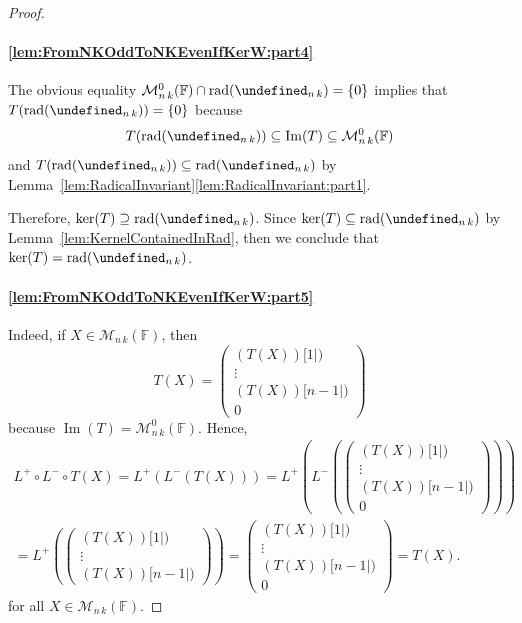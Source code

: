 \documentclass{elsarticle}
\DeclareMathOperator{\rad}{rad}
\DeclareMathOperator{\Ker}{ker}
\DeclareMathOperator{\Img}{Im}
\def\F{{\mathbb F}}
\def\M{{\mathcal M}}
\let\det\undefined
\DeclareMathOperator{\det}{det}
\theoremstyle{plain}
\theoremstyle{definition}
\numberwithin{equation}{section}
\begin{document}
\begin{proof}~\paragraph{\ref{lem:FromNKOddToNKEvenIfKerW:part4}} The obvious equality $\M^{0}_{n\,k}(\F) \cap \rad(\det_{n\,k}) = \{0\}$ implies that\linebreak $T(\rad(\det_{n\,k})) = \{0\}$ because 
$$T(\rad(\det_{n\,k})) \subseteq \Img(T) \subseteq \M^{0}_{n\,k}(\F)$$
 and $T(\rad(\det_{n\,k})) \subseteq \rad(\det_{n\,k})$ by Lemma~\ref{lem:RadicalInvariant}\ref{lem:RadicalInvariant:part1}.

Therefore, $\Ker(T) \supseteq \rad(\det_{n\,k})$. Since $\Ker(T) \subseteq \rad(\det_{n\,k})$ by Lemma~\ref{lem:KernelContainedInRad}, then we conclude that $\Ker(T) = \rad(\det_{n\,k})$.

\paragraph{\ref{lem:FromNKOddToNKEvenIfKerW:part5}} %
Indeed, if $X \in \M_{n\,k}(\F)$, then
\[
T(X) = \begin{pmatrix}(T(X))[1|)\\ \vdots \\(T(X))[n-1|)\\ 0\end{pmatrix}
\]
because $\Img(T) = \M^0_{n\,k}(\F)$. Hence, \begin{multline*}
L^{+}\circ L^{-} \circ T (X) = L^{+}(L^{-}(T(X)))
 = L^{+}(L^{-}(\begin{pmatrix}(T(X))[1|)\\ \vdots \\(T(X))[n-1|)\\ 0\end{pmatrix}))\\
 = L^{+}(\begin{pmatrix}(T(X))[1|)\\ \vdots \\(T(X))[n-1|)\end{pmatrix})
  = \begin{pmatrix}(T(X))[1|)\\ \vdots \\(T(X))[n-1|)\\ 0\end{pmatrix} = T(X).
\end{multline*}
for all $X \in \M_{n\,k}(\F)$.


\end{proof}
\end{document}
